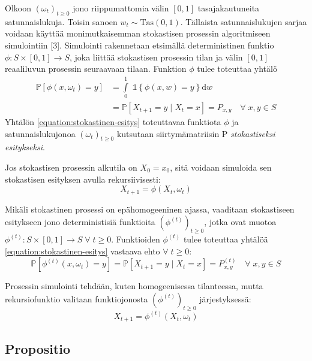 \documentclass[finnish, 12pt, a4paper, sci, utf8, pdfa]{aaltothesis}
\newcommand{\indicator}{\mathopen{\mathds{1}}}
\newcommand*{\prob}{\mathbb{P}}
\begin{document}
Olkoon \( (\omega_{t})_{t \geq 0} \) jono riippumattomia välin \( [0, 1] \) tasajakautuneita satunnaislukuja. Toisin sanoen \( w_{t} \sim \text{Tas}(0, 1) \). Tällaista satunnaislukujen sarjaa voidaan käyttää monimutkaisemman stokastisen prosessin algoritmiseen simulointiin [3]. Simulointi rakennetaan etsimällä deterministinen funktio \( \phi : S \times [0, 1] \to S \), joka liittää stokastisen prosessin tilan ja välin \( [0, 1] \) reaaliluvun prosessin seuraavaan tilaan. Funktion \( \phi \) tulee toteuttaa yhtälö
\begin{align}
   \prob \left[ \phi(x, \omega_{t}) = y \right] &= \int\limits_0^1 \; \indicator \left\{ \phi(x, w) = y \right\} \mathrm{d}w \\
                                                &= \prob \left[ X_{t+1} = y \mid X_{t} = x \right] = P_{x,y} \quad \forall \; x, y \in S
   \label{equation:stokastinen-esitys}
\end{align}
Yhtälön \ref{equation:stokastinen-esitys} toteuttavaa funktiota \( \phi \) ja satunnaislukujonoa \( (\omega_{t})_{t \geq 0} \) kutsutaan siirtymämatriisin P \textit{stokastiseksi esitykseksi}.

Jos stokastisen prosessin alkutila on \( X_{0} = x_{0} \), sitä voidaan simuloida sen stokastisen esityksen avulla rekursiivisesti:
\begin{equation}
   X_{t+1} = \phi(X_{t}, \omega_{t})
\end{equation}

Mikäli stokastinen prosessi on epähomogeeninen ajassa, vaaditaan stokastiseen esitykseen jono deterministisiä funktioita \( (\phi^{(t)})_{t \geq 0} \), jotka ovat muotoa \( \phi^{(t)} : S \times [0, 1] \to S \; \forall \; t \geq 0 \). Funktioiden \( \phi^{(t)} \) tulee toteuttaa yhtälöä \ref{equation:stokastinen-esitys} vastaava ehto \( \forall \; t \geq 0 \):
\begin{equation}
   \prob \left[ \phi^{(t)}(x, \omega_{t}) = y \right] = \prob \left[ X_{t+1} = y \mid X_{t} = x \right] = P^{(t)}_{x,y} \quad \forall \; x, y \in S
   \label{equation:epahom-stokastinen-esitys}
\end{equation}

Prosessin simulointi tehdään, kuten homogeenisessa tilanteessa, mutta rekursiofunktio valitaan funktiojonosta \( (\phi^{(t)})_{t \geq 0} \) järjestyksessä:
\begin{equation}
   X_{t+1} = \phi^{(t)}(X_{t}, \omega_{t})
\end{equation}

\subsection{Propositio}
\end{document}
